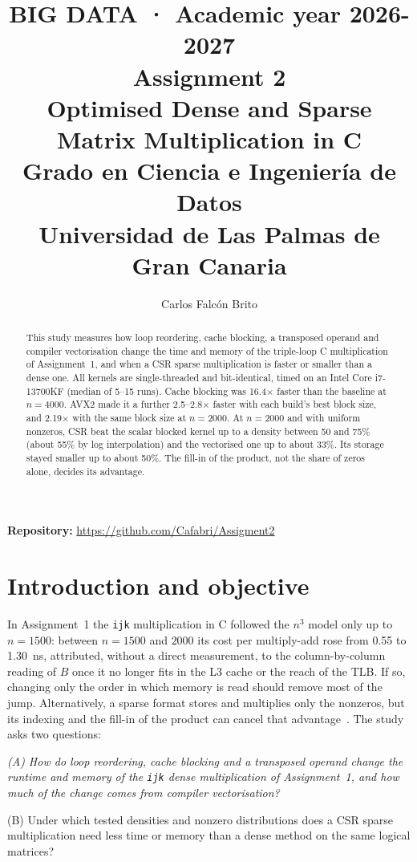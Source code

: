 \documentclass[11pt,a4paper]{article}
\title{
    \large \textbf{BIG DATA · Academic year 2026-2027} \\[0.4em]
    \LARGE Assignment 2 \\
    \Large Optimised Dense and Sparse Matrix Multiplication in C \\[0.4em]
    \small Grado en Ciencia e Ingeniería de Datos \\
    \small Universidad de Las Palmas de Gran Canaria
}
\author{Carlos Falcón Brito}
\date{}
\begin{document}
\maketitle
\thispagestyle{empty}

\begin{center}
\textbf{Repository:} \url{https://github.com/Cafabri/Assigment2}
\end{center}

\begin{abstract}
\noindent
This study measures how loop reordering, cache blocking, a transposed operand and compiler
vectorisation change the time and memory of the triple-loop C multiplication of
Assignment~1, and when a CSR sparse multiplication is faster or smaller than a dense one.
All kernels are single-threaded and bit-identical, timed on an Intel Core i7-13700KF (median
of 5--15 runs). Cache blocking was 16.4$\times$ faster than the baseline at $n = 4000$. AVX2
made it a further 2.5--2.8$\times$ faster with each build's best block size, and
2.19$\times$ with the same block size at $n = 2000$. At $n = 2000$ and with uniform
nonzeros, CSR beat the scalar blocked kernel up to a density between 50 and 75\% (about 55\%
by log interpolation) and the vectorised one up to about 33\%. Its storage stayed smaller up
to about 50\%. The fill-in of the product, not the share of zeros alone, decides its
advantage.
\end{abstract}

\section{Introduction and objective}

In Assignment~1 the \texttt{ijk} multiplication in C followed the $n^3$ model only up to
$n = 1500$: between $n = 1500$ and $2000$ its cost per multiply-add rose from 0.55 to
1.30~ns, attributed, without a direct measurement, to the column-by-column reading of $B$
once it no longer fits in the L3 cache or the reach of the TLB. If so, changing only the
order in which memory is read should remove most of the jump. Alternatively, a sparse format
stores and multiplies only the nonzeros, but its indexing and the fill-in of the product can
cancel that advantage~\cite{gustavson1978}. The study asks two questions:

\begin{center}
\begin{minipage}{0.92\textwidth}
\itshape (A) How do loop reordering, cache blocking and a transposed operand change the
runtime and memory of the \texttt{ijk} dense multiplication of Assignment~1, and how much of
the change comes from compiler vectorisation?

(B) Under which tested densities and nonzero distributions does a CSR sparse multiplication
need less time or memory than a dense method on the same logical matrices?
\end{minipage}
\end{center}
\end{document}
